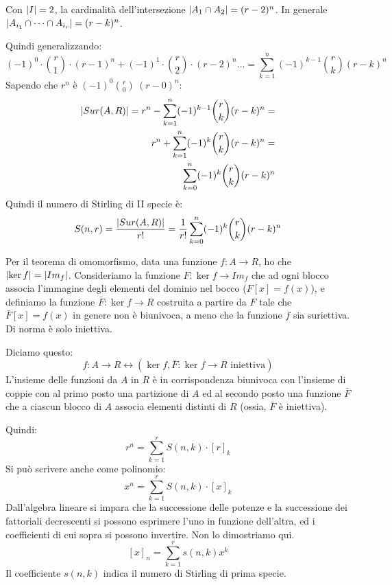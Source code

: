 Con $\left\lvert{I}\right\rvert = 2$, la cardinalit\`a dell'intersezione $\left\lvert{A_1 \cap A_2}\right\rvert = (r - 2)^n$. In generale $\left\lvert{A_{i_1} \cap \dots \cap A_{i_r}}\right\rvert = (r - k)^n$.

Quindi generalizzando:
\[
(-1)^0 \cdot \binom{r}{1} \cdot (r-1)^n + 
(-1)^1 \cdot \binom{r}{2} \cdot (r-2)^n \dots =
\sum_{k = 1}^{n} (-1)^{k - 1} \binom{r}{k} (r - k)^n
\]
Sapendo che $r^n$ \`e $(-1)^0 \binom{r}{0} \ (r - 0)^n$:
\begin{align*}
\left\lvert{Sur(A,R)}\right\rvert = 
r^n - \sum_{k = 1}^{n} (-1)^{k - 1} \binom{r}{k} (r - k)^n =  \\
r^n + \sum_{k = 1}^{n} (-1)^{k} \binom{r}{k} (r - k)^n =  \\
\sum_{k = 0}^{n} (-1)^{k} \binom{r}{k} (r - k)^n
\end{align*}
Quindi il numero di Stirling di II specie \`e:
\begin{equation}
S(n,r) = \frac{\left\lvert{Sur(A,R)}\right\rvert}{r!} = \frac{1}{r!} \sum_{k = 0}^{n} (-1)^{k} \binom{r}{k} (r - k)^n
\end{equation}

Per il teorema di omomorfismo, data una funzione $f : A \to R$, ho che $\left\lvert{\ker f}\right\rvert = \left\lvert{Im_f}\right\rvert$. Consideriamo la funzione $F : \ker f \to Im_f$ che ad ogni blocco associa l'immagine degli elementi del dominio nel bocco ($F[x] = f(x)$), e definiamo la funzione $\bar F : \ker f \to R$ costruita a partire da $F$ tale che $\bar F [x] = f(x)$ in genere non \`e biunivoca, a meno che la funzione $f$ sia suriettiva. Di norma \`e solo iniettiva.

Diciamo questo:
\begin{equation}
f : A \to R \leftrightarrow ( \ker f , \bar F : \ker f \to R \text{ iniettiva})
\end{equation}
L'insieme delle funzioni da $A$ in $R$ \`e in corrispondenza biunivoca con l'insieme di coppie con al primo posto una partizione di $A$ ed al secondo posto una funzione $\bar F$ che a ciascun blocco di $A$ associa elementi distinti di $R$ (ossia, $\bar F$ \`e iniettiva).

Quindi:
\[
r^n = \sum_{k = 1}^{r} S(n, k) \cdot [r]_k
\]
Si pu\`o scrivere anche come polinomio:
\[
x^n = \sum_{k = 1}^{r} S(n, k) \cdot [x]_k
\]
Dall'algebra lineare si impara che la successione delle potenze e la successione dei fattoriali decrescenti si possono esprimere l'uno in funzione dell'altra, ed i coefficienti di cui sopra si possono invertire. Non lo dimostriamo qui.
\[
[x]_n = \sum_{k = 1}^{r} s(n, k) x^k
\]
Il coefficiente $s(n, k)$ indica il numero di Stirling di prima specie.


